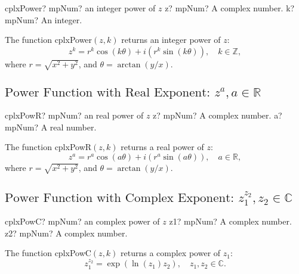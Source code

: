 \begin{mpFunctionsExtract}
	\mpFunctionTwo
	{cplxPower? mpNum? an integer power of $z$}
	{z? mpNum? A complex number.}
	{k? mpNum? An integer.}
\end{mpFunctionsExtract}

\vspace{0.3cm}
The function \textsf{cplxPower$(z, k)$} returns an integer power of $z$: 
\begin{equation}
	z^k = r^k \cos(k \theta) + i(r^k \sin(k \theta)), \quad  k \in  \mathbb{Z},
\end{equation}
where $r=\sqrt{x^2+y^2}$, and $\theta=\arctan(y/x)$.



\newpage
\subsection{\texorpdfstring{$\text{Power Function with Real Exponent: }z^a, a \in  \mathbb{R}$}{powerxy}}

\begin{mpFunctionsExtract}
	\mpFunctionTwo
	{cplxPowR? mpNum? an real power of $z$}
	{z? mpNum? A complex number.}
	{a? mpNum? A real number.}
\end{mpFunctionsExtract}

\vspace{0.3cm}
The function \textsf{cplxPowR$(z, k)$} returns a real power of $z$: 
\begin{equation}
	z^a = r^a \cos(a \theta) + i(r^a \sin(a \theta)), \quad  a \in  \mathbb{R},
\end{equation}
where $r=\sqrt{x^2+y^2}$, and $\theta=\arctan(y/x)$.





\subsection{\texorpdfstring{$\text{Power Function with Complex Exponent: }z_1^{z_2}, z_2 \in  \mathbb{C}$}{powerxy}}

\begin{mpFunctionsExtract}
	\mpFunctionTwo
	{cplxPowC? mpNum? an complex power of $z$}
	{z1? mpNum? A complex number.}
	{z2? mpNum? A complex number.}
\end{mpFunctionsExtract}

\vspace{0.3cm}
The function \textsf{cplxPowC$(z, k)$} returns a complex power of $z_1$: 
\begin{equation}
	z_1^{z_2} = \exp(\ln(z_1) z_2) , \quad  z_1, z_2 \in  \mathbb{C}.
\end{equation}



